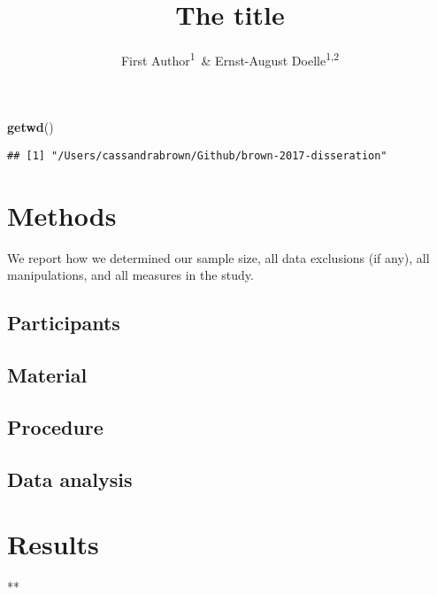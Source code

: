 \documentclass[english,man]{apa6}
\title{The title}
\author{First Author\textsuperscript{1}~\& Ernst-August Doelle\textsuperscript{1,2}}
\affiliation{
    \vspace{0.5cm}
          \textsuperscript{1} Wilhelm-Wundt-University\\
          \textsuperscript{2} Konstanz Business School  }
\newenvironment{Shaded}{\begin{snugshade}}{\end{snugshade}}
\newcommand{\KeywordTok}[1]{\textcolor[rgb]{0.13,0.29,0.53}{\textbf{{#1}}}}
\newcommand{\NormalTok}[1]{{#1}}
\theoremstyle{definition}
\theoremstyle{definition}
\theoremstyle{remark}
\begin{document}
\maketitle

\setcounter{secnumdepth}{0}



\begin{Shaded}
\begin{Highlighting}[]
\KeywordTok{getwd}\NormalTok{()}
\end{Highlighting}
\end{Shaded}

\begin{verbatim}
## [1] "/Users/cassandrabrown/Github/brown-2017-disseration"
\end{verbatim}

\section{Methods}\label{methods}

We report how we determined our sample size, all data exclusions (if
any), all manipulations, and all measures in the study.

\subsection{Participants}\label{participants}

\subsection{Material}\label{material}

\subsection{Procedure}\label{procedure}

\subsection{Data analysis}\label{data-analysis}

\section{Results}\label{results}

\label{tab:descriptive-statistics}**
\end{document}
